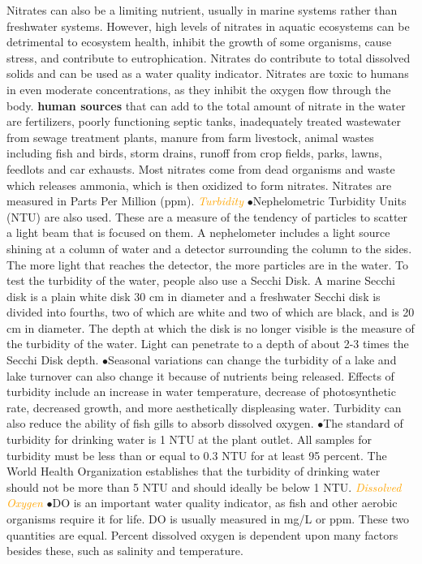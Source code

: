 \documentclass{article}
\newcommand{\ddd}{$\bullet$}
\newcommand{\orange}[1]{\textcolor{orange}{#1}}
\newcommand{\mysubsection}[1]{{\textit{\orange{#1}}}}
\begin{document}
\begin{multicols*}{4}
           Nitrates can also be a limiting nutrient, usually in marine systems rather than freshwater systems. However, high levels of nitrates in aquatic ecosystems can be detrimental to ecosystem health, inhibit the growth of some organisms, cause stress, and contribute to eutrophication. Nitrates do contribute to total dissolved solids and can be used as a water quality indicator. Nitrates are toxic to humans in even moderate concentrations, as they inhibit the oxygen flow through the body. \textbf{human sources} that can add to the total amount of nitrate in the water are fertilizers, poorly functioning septic tanks, inadequately treated wastewater from sewage treatment plants, manure from farm livestock, animal wastes including fish and birds, storm drains, runoff from crop fields, parks, lawns, feedlots and car exhausts. Most nitrates come from dead organisms and waste which releases ammonia, which is then oxidized to form nitrates. Nitrates are measured in Parts Per Million (ppm).
        \mysubsection{Turbidity}
            \ddd Nephelometric Turbidity Units (NTU) are also used. These are a measure of the tendency of particles to scatter a light beam that is focused on them. A nephelometer includes a light source shining at a column of water and a detector surrounding the column to the sides. The more light that reaches the detector, the more particles are in the water. To test the turbidity of the water, people also use a Secchi Disk. A marine Secchi disk is a plain white disk 30 cm in diameter and a freshwater Secchi disk is divided into fourths, two of which are white and two of which are black, and is 20 cm in diameter. The depth at which the disk is no longer visible is the measure of the turbidity of the water. Light can penetrate to a depth of about 2-3 times the Secchi Disk depth. 
            \ddd Seasonal variations can change the turbidity of a lake and lake turnover can also change it because of nutrients being released. Effects of turbidity include an increase in water temperature, decrease of photosynthetic rate, decreased growth, and more aesthetically displeasing water. Turbidity can also reduce the ability of fish gills to absorb dissolved oxygen. 
            \ddd The standard of turbidity for drinking water is 1 NTU at the plant outlet. All samples for turbidity must be less than or equal to 0.3 NTU for at least 95 percent. The World Health Organization establishes that the turbidity of drinking water should not be more than 5 NTU and should ideally be below 1 NTU. 
        \mysubsection{Dissolved Oxygen}
            \ddd DO is an important water quality indicator, as fish and other aerobic organisms require it for life. DO is usually measured in mg/L or ppm. These two quantities are equal. Percent dissolved oxygen is dependent upon many factors besides these, such as salinity and temperature.

\end{multicols*}
\end{document}
